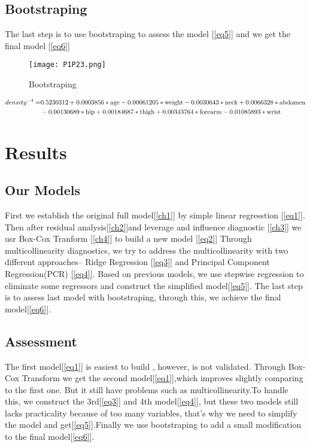 \documentclass[11pt]{article}
\begin{document}
\subsection{Bootstraping}\label{ch7}

The last step is to use bootstraping to assess the model [\ref{eq5}] and we get the final model [\ref{eq6}]
\begin{figure}[!htb]
\centering
\texttt{[image: P1P23.png]}
\caption{Bootstraping}\label{Fig20}
\end{figure}
     
\begin{align}
density^{-4} = &0.5230312+ 0.0003856*\text{age}- 0.00061205*\text{weight}-0.0030643*\text{neck}+0.0066328*\text{abdomen}\notag\\&-0.00130689*\text{hip}+0.00184687*\text{thigh}+0.00343764*\text{forearm}-0.01085893*\text{wrist}\label{eq6}
\end{align}

\section{Results}

\subsection{Our Models}

First we establish the original full model[\ref{ch1}] by simple linear regresstion [\ref{eq1}].
Then after residual analysis[\ref{ch2}]and leverage and influence diagnostic [\ref{ch3}] we usr Box-Cox Tranform [\ref{ch4}] to build a new model [\ref{eq2}]
Through multicollinearity diagnostics, we try to address the multicollinearity with two different approaches-- Ridge Regression [\ref{eq3}] and Principal Component Regression(PCR) [\ref{eq4}].
Based on previous models, we use stepwise regression to eliminate some regressors and construct the simplified model[\ref{eq5}].
The last step is to assess last model with bootstraping, through this, we achieve the final model[\ref{eq6}].

\subsection{Assessment}
The first model[\ref{eq1}] is easiest to build , however, is not validated. Through Box-Cox Transform we get the second model[\ref{eq1}],which improves slightly comparing to the first one. But it still have problems such as multicollinearity.To handle this, we construct the 3rd[\ref{eq3}] and 4th model[\ref{eq4}], but these two models still lacks practicality because of too many variables, that's why we need to simplify the model and get[\ref{eq5}].Finally we use bootstraping to add a small modification to the final model[\ref{eq6}].
\end{document}
